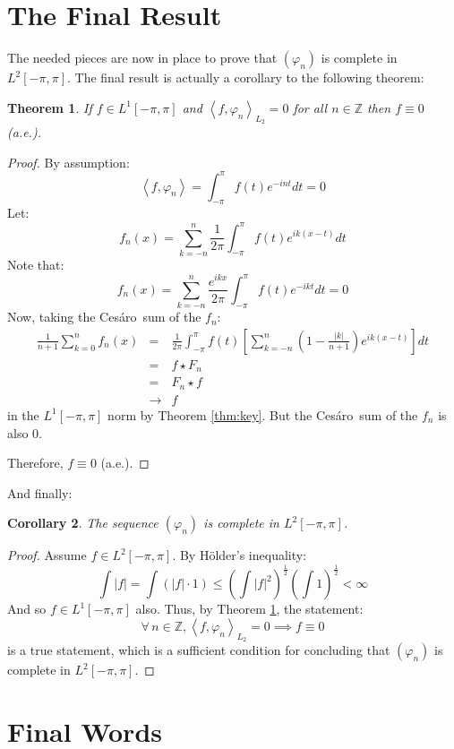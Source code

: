 \documentclass[letterpaper,12pt,fleqn,reqno]{amsart}
\theoremstyle{plain}
\newtheorem{theorem}{Theorem}[section]
\newtheorem{corollary}[theorem]{Corollary}
\newcommand{\Z}{\mathbb{Z}}
\newcommand{\vp}{\varphi}
\newcommand{\Lop}{L^1[-\pi,\pi]}
\newcommand{\Ltp}{L^2[-\pi,\pi]}
\newcommand{\abs}[1]{\left|#1\right|}
\newcommand{\inner}[1]{\left<#1\right>}
\newcommand{\Ces}{Ces\'{a}ro\ }
\begin{document}
\section{The Final Result}

The needed pieces are now in place to prove that $(\vp_n)$ is complete in
$\Ltp$. The final result is actually a corollary to the following theorem:

\begin{theorem}
  \label{thm:final}
  If $f\in\Lop$ and $\inner{f,\vp_n}_{L_2}=0$ for all $n\in\Z$ then $f\equiv0$
  (a.e.).
\end{theorem}

\begin{proof}
  By assumption:
  \[\inner{f,\vp_n}=\int_{-\pi}^{\pi}f(t)e^{-int}dt=0\]
  Let:
  \[f_n(x)=\sum_{k=-n}^n\frac{1}{2\pi}\int_{-\pi}^{\pi}f(t)e^{ik(x-t)}dt\]
  Note that:
  \[f_n(x)=\sum_{k=-n}^n\frac{e^{ikx}}{2\pi}\int_{-\pi}^{\pi}f(t)e^{-ikt}dt=0\]
  Now, taking the \Ces sum of the $f_n$:
  \begin{eqnarray*}
    \frac{1}{n+1}\sum_{k=0}^nf_n(x) &=&
    \frac{1}{2\pi}\int_{-\pi}^{\pi}f(t)\left[
      \sum_{k=-n}^n\left(1-\frac{\abs{k}}{n+1}\right)e^{ik(x-t)}\right]dt \\
    &=& f\star F_n \\
    &=& F_n\star f \\
    &\to& f
  \end{eqnarray*}
  in the $\Lop$ norm by Theorem \ref{thm:key}. But the \Ces sum of the $f_n$ is
  also $0$.

  Therefore, $f\equiv0$ (a.e.).
\end{proof}

And finally:

\begin{corollary}
  The sequence $(\vp_n)$ is complete in $\Ltp$.
\end{corollary}

\begin{proof}
  Assume $f\in\Ltp$. By H\"{o}lder's inequality:
  \[\int\abs{f}=\int(\abs{f}\cdot1)\le
  \left(\int\abs{f}^2\right)^{\frac{1}{2}}\left(\int1\right)^{\frac{1}{2}}<\infty\]
  And so $f\in\Lop$ also. Thus, by Theorem \ref{thm:final}, the statement:
  \[\forall\,n\in\Z,\inner{f,\vp_n}_{L_2}=0\implies f\equiv 0\]
  is a true statement, which is a sufficient condition for concluding that
  $(\vp_n)$ is complete in $\Ltp$.
\end{proof}

\section{Final Words}
\end{document}
